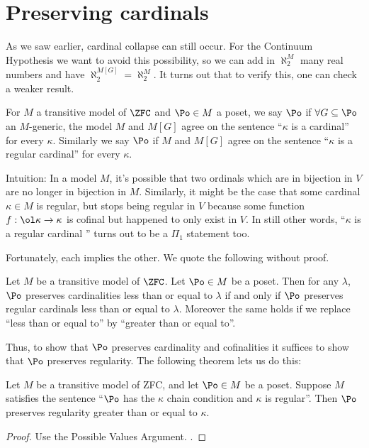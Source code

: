\section{Preserving cardinals}
As we saw earlier, cardinal collapse can still occur.
For the Continuum Hypothesis we want to avoid this possibility,
so we can add in $\aleph_2^M$ many real numbers and have $\aleph_2^{M[G]} = \aleph_2^M$.
It turns out that to verify this, one can check a weaker result.

\begin{definition}
	For $M$ a transitive model of $\ZFC$ and $\Po \in M$ a poset,
	we say $\Po$  if
	$\forall G \subseteq \Po$ an $M$-generic,
	the model $M$ and $M[G]$ agree on the sentence ``$\kappa$ is a cardinal'' for every $\kappa$.
	Similarly we say $\Po$  if $M$ and $M[G]$
	agree on the sentence ``$\kappa$ is a regular cardinal'' for every $\kappa$.
\end{definition}
Intuition:
In a model $M$, it's possible that two ordinals which are in bijection in $V$ are no longer in bijection in $M$.
Similarly, it might be the case that some cardinal $\kappa \in M$ is regular,
but stops being regular in $V$ because some function $f : \ol\kappa \to \kappa$ is cofinal but happened to only exist in $V$.
In still other words, ``$\kappa$ is a regular cardinal '' turns out to be a $\Pi_1$ statement too.

Fortunately, each implies the other.
We quote the following without proof.
\begin{proposition}
	Let $M$ be a transitive model of $\ZFC$.
	Let $\Po \in M$ be a poset.
	Then for any $\lambda$,
		$\Po$ preserves cardinalities less than or equal to $\lambda$
		if and only if $\Po$ preserves regular cardinals less than or equal to $\lambda$.
	Moreover the same holds if we replace ``less than or equal to''
	by ``greater than or equal to''.
\end{proposition}

Thus, to show that $\Po$ preserves cardinality and cofinalities
it suffices to show that $\Po$ preserves regularity.
The following theorem lets us do this:
\begin{theorem}
	Let $M$ be a transitive model of ZFC, and let $\Po \in M$ be a poset.
	Suppose $M$ satisfies the sentence ``$\Po$ has the $\kappa$ chain condition and $\kappa$ is regular''.
	Then $\Po$ preserves regularity greater than or equal to $\kappa$.
\end{theorem}
\begin{proof}
	Use the Possible Values Argument.
	.
\end{proof}

